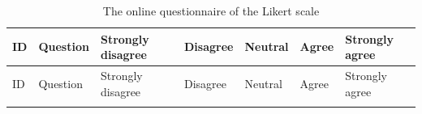 \documentclass[sigconf]{acmart}
\begin{document}
\renewcommand{\thetable}{A\arabic{table}} %
\setcounter{table}{0}

\begin{longtable}{p{0.6cm}p{9cm}p{1.2cm}p{1cm}p{1cm}p{1cm}p{1cm}}
\caption{The online questionnaire of the Likert scale} \label{Table2} \\
\toprule
ID & Question & Strongly disagree & Disagree & Neutral & Agree & Strongly agree \\
\midrule
\endfirsthead

\toprule
ID & Question & Strongly disagree & Disagree & Neutral & Agree & Strongly agree \\
\midrule
\endhead

\midrule
\endfoot

\bottomrule
\endlastfoot


\end{longtable}
\end{document}
